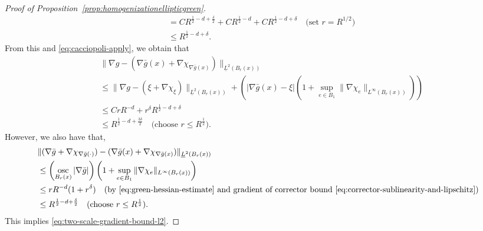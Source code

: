 \documentclass[12pt]{amsart}
\numberwithin{equation}{section}
\begin{document}
\begin{proof}[Proof of Proposition~\ref{prop:homogenizationellipticgreen}]
\begin{align*}
			&= C R^{\frac{1}{2} - d + \frac{\delta}{2} } + C R^{\frac{1}{2} - d} + C R^{\frac{1}{2} - d + \delta} \quad\mbox{(set $r = R^{1/2}$)} \\
			&\leq R^{\frac{1}{2}-d + \delta}.
		\end{align*}
		From this and \eqref{eq:cacciopoli-apply}, we obtain that 
		\begin{align*}
			&\| \nabla g - (\nabla \bar{g}(x) + \nabla \chi_{\nabla \bar{g}(x)}) \|_{\underline{L}^2(B_r(x))} \\
			&\leq  \| \nabla g - (\xi + \nabla \chi_{\xi}) \|_{\underline{L}^2(B_r(x))} 
			+ \left( | \nabla \bar{g}(x) - \xi| ( 1 + \sup_{e \in B_1} \| \nabla \chi_e \|_{L^\infty(B_r(x))} )\right) \\
			&\leq C r R^{-d} + r^\delta R^{\frac{1}{2}-d + \delta} \\
			&\leq R^{\frac{1}{2} - d + \frac{3\delta}{2}}  \quad \mbox{(choose $r \leq R^{\frac{1}{2}}$)}.
		\end{align*}
		However, we also have that, 
		\begin{align*}
			&\| (\nabla \bar{g} + \nabla \chi_{\nabla \bar{g}(\cdot)}) - (\nabla \bar{g}(x) + \nabla \chi_{\nabla \bar{g}(x)}) \|_{\underline{L}^2(B_r(x))} \\
			&\leq  \left( \operatorname*{osc}_{B_r(x)} |\nabla \bar{g}| \right)  \left( 1 + \sup_{e \in B_1} \| \nabla \chi_e \|_{L^\infty(B_r(x))} \right) \\
			&\leq  r R^{-d}(1 + r^\delta)\quad \mbox{(by \eqref{eq:green-hessian-estimate} and gradient of corrector bound~\eqref{eq:corrector-sublinearity-and-lipschitz})} \\
			&\leq R^{\frac{1}{2} - d + \frac{\delta}{2}}  \quad \mbox{(choose $r \leq  R^{\frac{1}{2}}$)}. 
		\end{align*}
		This implies  \eqref{eq:two-scale-gradient-bound-l2}. 
	\end{proof}
	
\end{document}
